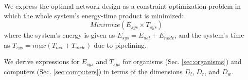 \documentclass[12pt]{article}
\begin{document}

We express the optimal network design as a constraint optimization 
problem in which the whole system's energy-time product is minimized:
\begin{equation}
Minimize(E_{sys} \times T_{sys})
\label{eq:TheWholeEnchilada}
\end{equation}
where the system's energy is given as $E_{sys} = E_{net} + E_{node}$, 
and the system's time as $T_{sys} = max(T_{net} + T_{node})$ due to pipelining.

We derive expressions for $E_{sys}$ and $T_{sys}$
for organisms (Sec. \ref{sec:organisms}) and computers
(Sec. \ref{sec:computers}) in terms of the dimensions $D_l$, $D_r$,
and $D_w$.  




\end{document}
